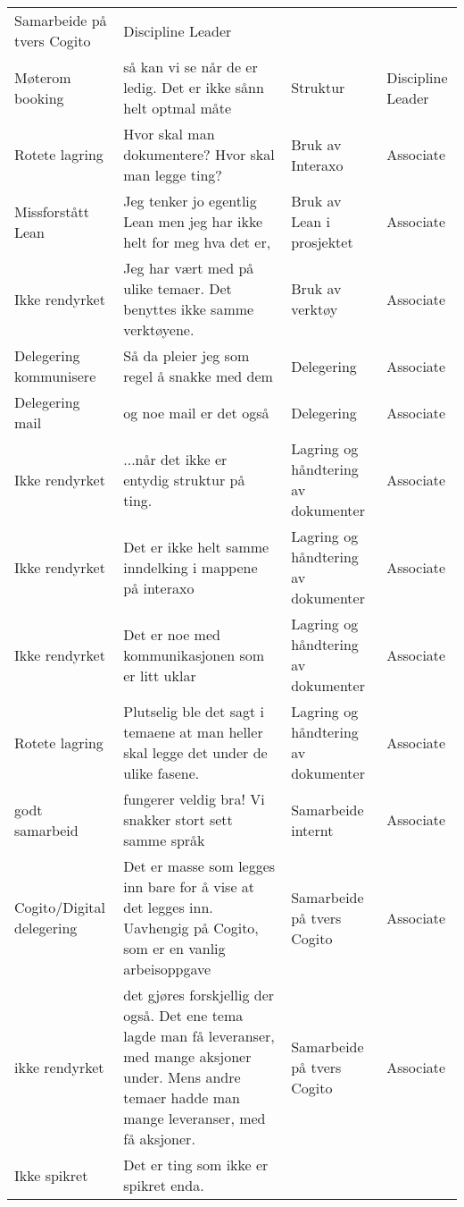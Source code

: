 \begin{landscape}
\begin{longtable}{p{0.25\textheight}p{0.5\textheight}p{0.25\textheight}p{0.25\textheight}}
      Samarbeide på tvers Cogito &
      Discipline Leader \\
    Møterom booking &
      så kan vi se når de er ledig. Det er ikke sånn helt optmal måte &
      Struktur &
      Discipline Leader \\
    Rotete lagring &
      Hvor skal man dokumentere? Hvor skal man legge ting? &
      Bruk av Interaxo &
      Associate \\
    Missforstått Lean &
      Jeg tenker jo egentlig Lean men jeg har ikke helt for meg hva det er, &
      Bruk av Lean i prosjektet &
      Associate \\
    Ikke rendyrket &
      Jeg har vært med på ulike temaer. Det benyttes ikke samme verktøyene. &
      Bruk av verktøy &
      Associate \\
    Delegering kommunisere &
      Så da pleier jeg som regel å snakke med dem &
      Delegering &
      Associate \\
    Delegering mail &
      og noe mail er det også &
      Delegering &
      Associate \\
    Ikke rendyrket &
      ...når det ikke er entydig struktur på ting. &
      Lagring og håndtering av dokumenter &
      Associate \\
    Ikke rendyrket &
      Det er ikke helt samme inndelking i mappene på interaxo &
      Lagring og håndtering av dokumenter &
      Associate \\
    Ikke rendyrket &
      Det er noe med kommunikasjonen som er litt uklar &
      Lagring og håndtering av dokumenter &
      Associate \\
    Rotete lagring &
      Plutselig ble det sagt i temaene at man heller skal legge det under de ulike fasene. &
      Lagring og håndtering av dokumenter &
      Associate \\
    godt samarbeid &
      fungerer veldig bra! Vi snakker stort sett samme språk &
      Samarbeide internt &
      Associate \\
    Cogito/Digital delegering &
      Det er masse som legges inn bare for å vise at det legges inn. Uavhengig på Cogito, som er en vanlig arbeisoppgave &
      Samarbeide på tvers Cogito &
      Associate \\
    ikke rendyrket &
      det gjøres forskjellig der også. Det ene tema lagde man få leveranser, med mange aksjoner under. Mens andre temaer hadde man mange leveranser, med få aksjoner. &
      Samarbeide på tvers Cogito &
      Associate \\
    Ikke spikret &
      Det er ting som ikke er spikret enda. &

\end{longtable}
\end{landscape}
